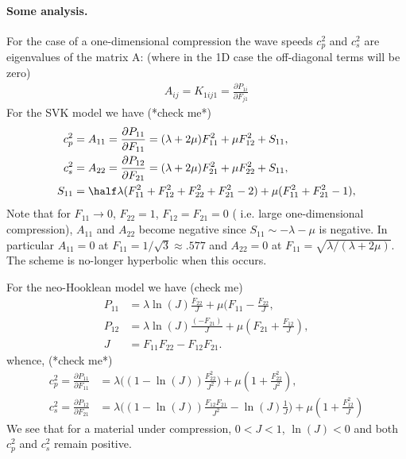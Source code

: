 \paragraph{Some analysis.}
   For the case of a one-dimensional compression the wave speeds $c_p^2$ and $c_s^2$ are eigenvalues of the
matrix A: (where in the 1D case the off-diagonal terms will be zero)
\begin{align}
   A_{ij} = K_{1ij1} = \frac{\partial P_{1i}}{\partial F_{j1}}
\end{align}
For the SVK model we have (*check me*)
\begin{align}
    c_p^2 &= A_{11} = \frac{\partial P_{11}}{\partial F_{11}} = (\lambda+2\mu) F_{11}^2  + \mu F_{12}^2 + S_{11}, \\
    c_s^2 &= A_{22} = \frac{\partial P_{12}}{\partial F_{21}} = (\lambda+2\mu) F_{21}^2  + \mu F_{22}^2 + S_{11}, \\
   S_{11} &= \half\lambda( F_{11}^2 + F_{12}^2+ F_{22}^2  + F_{21}^2 -2 ) + \mu( F_{11}^2 + F_{21}^2 -1 ), 
\end{align}
Note that for $F_{11}\rightarrow 0$, $F_{22}=1$, $F_{12}=F_{21}=0$ (
i.e. large one-dimensional compression), $A_{11}$ and $A_{22}$ become negative since $S_{11}\sim -\lambda-\mu $ is negative.
In particular $A_{11}=0$ at $F_{11}=1/\sqrt{3}\approx .577$ and $A_{22}=0$ at $F_{11}=\sqrt{\lambda/(\lambda+2\mu)}$.
The scheme is no-longer hyperbolic when this occurs.

For the neo-Hooklean model we have (check me)
\begin{align}
   P_{11} &= \lambda \ln( J ) \frac{F_{22}}{J} + \mu( F_{11} - \frac{F_{22}}{J}, \\
   P_{12} &= \lambda \ln( J ) \frac{(-F_{21})}{J} + \mu( F_{21} + \frac{F_{12}}{J}), \\
   J &= F_{11}F_{22} -F_{12} F_{21} .
\end{align}
whence, (*check me*)
\begin{align}
 c_p^2  = \frac{\partial P_{11}}{\partial F_{11}} &= \lambda\Big( (1-\ln(J)) \frac{F_{22}^2}{J^2}\Big) + \mu( 1 + \frac{F_{22}^2}{J^2} ), \\
 c_s^2 = \frac{\partial P_{12}}{\partial F_{21}} &= \lambda\Big( (1-\ln(J))\frac{F_{12} F_{21}}{J^2} - \ln(J)\frac{1}{J} \Big)
         + \mu( 1 + \frac{F_{12}^2}{J} )
\end{align}
We see that for a material under compression, $0<J<1$, $\ln(J)<0$ and both $c_p^2$ and $c_s^2$ remain positive. 


